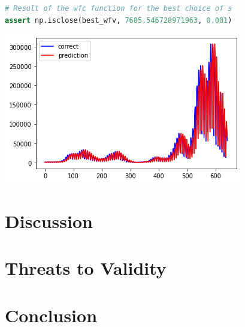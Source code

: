 \documentclass[acmsmall,screen,review,anonymous]{acmart}
\begin{document}
\begin{minipage}{0.5\textwidth}
  \begin{lstlisting}[language=Python]
# Result of the wfc function for the best choice of s
assert np.isclose(best_wfv, 7685.546728971963, 0.001)
  \end{lstlisting}
\end{minipage}
\begin{minipage}{0.5\textwidth}
  \includegraphics[width=\linewidth]{../catalogue/select-117b.png}
\end{minipage}

\section{Discussion}\label{sec:discuss}



\section{Threats to Validity}\label{sec:threats}

\section{Conclusion}\label{sec:conclude}
\end{document}
